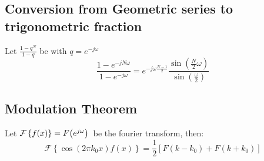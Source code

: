 \documentclass[accentcolor=tud4c,9.5pt,nochapname,bigchapter,paper=a5report]{tudreport}
\begin{document}
\subsection{Conversion from Geometric series to trigonometric fraction} \label{geomconv}
Let $\frac{1-q^{N}}{1-q}$ be with $q = e^{-j\omega}$
\begin{equation}
\frac{1-e^{-jN\omega}}{1-e^{-j\omega}} = e^{-j\omega \frac{N-1}{2}}\frac{\sin\left(\frac{N}{2}\omega\right)}{\sin\left(\frac{\omega}{2}\right)}
\end{equation}

\subsection{Modulation Theorem}
Let $\mathcal{F}\left\{f(x)\right\}=F{\left(e^{j\omega}\right)}\,$ be the fourier transform, then:
\begin{equation}
\mathcal{F}\left\{\cos(2\pi k_0 x)f(x)\right\} = \frac{1}{2}\left[F(k-k_0)+F(k+k_0)\right]
\end{equation}
\end{document}

